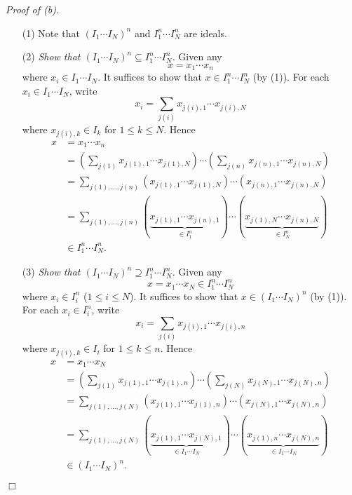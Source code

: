\documentclass{article}
\begin{document}
\emph{Proof of (b).}
\begin{enumerate}
\item[(1)]
  Note that $(I_1 \cdots I_N)^n$ and $I_1^n \cdots I_N^n$ are ideals.

\item[(2)]
  \emph{Show that $(I_1 \cdots I_N)^n \subseteq I_1^n \cdots I_N^n$.}
  Given any
  \[
    x = x_1 \cdots x_n
  \]
  where $x_i \in I_1 \cdots I_N$.
  It suffices to show that $x \in I_1^n \cdots I_N^n$ (by (1)).
  For each $x_i \in I_1 \cdots I_N$, write
  \[
    x_i = \sum_{j(i)} x_{j(i),1} \cdots x_{j(i),N}
  \]
  where $x_{j(i),k} \in I_k$ for $1 \leq k \leq N$.
  Hence
  \begin{align*}
    x
    &= x_1 \cdots x_n \\
    &= \left(\sum_{j(1)} x_{j(1),1} \cdots x_{j(1),N}\right)
      \cdots
      \left(\sum_{j(n)} x_{j(n),1} \cdots x_{j(n),N}\right) \\
    &= \sum_{j(1),\ldots,j(n)} (x_{j(1),1} \cdots x_{j(1),N})
      \cdots (x_{j(n),1} \cdots x_{j(n),N}) \\
    &= \sum_{j(1),\ldots,j(n)}
      (\underbrace{x_{j(1),1} \cdots x_{j(n),1}}_{\in I_1^n})
      \cdots
      (\underbrace{x_{j(1),N} \cdots x_{j(n),N}}_{\in I_N^n}) \\
    &\in I_1^n \cdots I_N^n.
  \end{align*}

\item[(3)]
  \emph{Show that $(I_1 \cdots I_N)^n \supseteq I_1^n \cdots I_N^n$.}
  Given any
  \[
    x = x_1 \cdots x_N \in I_1^n \cdots I_N^n
  \]
  where $x_i \in I_i^n$ ($1 \leq i \leq N$).
  It suffices to show that
  $x \in (I_1 \cdots I_N)^n$ (by (1)).
  For each $x_i \in I_i^n$, write
  \[
    x_i = \sum_{j(i)} x_{j(i),1} \cdots x_{j(i),n}
  \]
  where $x_{j(i),k} \in I_i$ for $1 \leq k \leq n$.
  Hence
  \begin{align*}
    x
    &= x_1 \cdots x_N \\
    &= \left(\sum_{j(1)} x_{j(1),1} \cdots x_{j(1),n}\right)
      \cdots
      \left(\sum_{j(N)} x_{j(N),1} \cdots x_{j(N),n}\right) \\
    &= \sum_{j(1),\ldots,j(N)} (x_{j(1),1} \cdots x_{j(1),n})
      \cdots (x_{j(N),1} \cdots x_{j(N),n}) \\
    &= \sum_{j(1),\ldots,j(N)}
      (\underbrace{x_{j(1),1} \cdots x_{j(N),1}}_{\in I_1 \cdots I_N})
      \cdots
      (\underbrace{x_{j(1),n} \cdots x_{j(N),n}}_{\in I_1 \cdots I_N}) \\
    &\in (I_1 \cdots I_N)^n.
  \end{align*}
\end{enumerate}
$\Box$ \\\\
\end{document}
